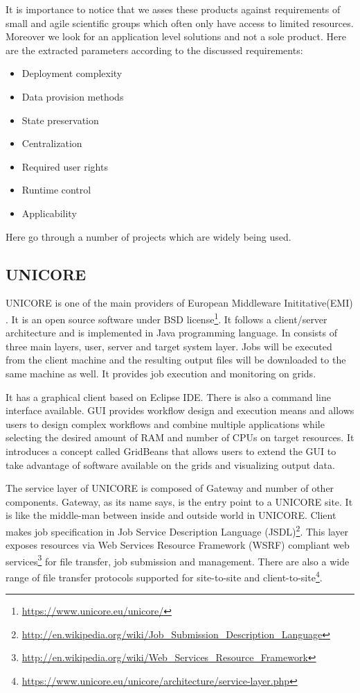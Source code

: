 It is importance to notice that we asses these products against 
requirements of small and agile scientific groups which often only have access to limited resources.
Moreover we look for an application level solutions and not a sole product.
Here are the extracted parameters according to the discussed requirements:

\begin{itemize}
\item Deployment complexity
\item Data provision methods
\item State preservation
\item Centralization
\item Required user rights
\item Runtime control
\item Applicability
\end{itemize}
Here go through a number of projects which are widely being used.
\subsection{UNICORE}
UNICORE is one of the main providers of European Middleware Inititative(EMI) \cite{EMI}. 
It is an open source software under BSD license\footnote{\url{https://www.unicore.eu/unicore/}}.
It follows a client/server architecture and is implemented in Java programming
language.
In consists of three main layers, user, server and target system layer. 
Jobs will be executed from the client machine and the resulting output files will be downloaded
to the same machine as well. It provides job execution and monitoring on grids.\cite{unicore_wp}

It has a graphical client based on Eclipse IDE. There
is also a command line interface available. GUI provides workflow design and execution means and 
allows users to design complex workflows and combine multiple applications while selecting
the desired amount of RAM and number of CPUs on target resources. It introduces a concept 
called GridBeans that allows users to extend the GUI to take advantage of software available on
the grids and visualizing output data.

The service layer of UNICORE is composed of Gateway and number of other components. Gateway, as
its name says, is the entry point to a UNICORE site. It is like the middle-man between inside
and outside world in UNICORE. Client makes job specification in Job Service Description Language
 (JSDL)\footnote{\url{http://en.wikipedia.org/wiki/Job_Submission_Description_Language}}.
 This layer exposes resources via Web Services Resource Framework (WSRF) compliant web 
 services\footnote{\url{http://en.wikipedia.org/wiki/Web_Services_Resource_Framework}}
 for file transfer, job submission and management. There are also a wide range of file transfer
 protocols supported for site-to-site and 
 client-to-site\footnote{\url{https://www.unicore.eu/unicore/architecture/service-layer.php}}.

